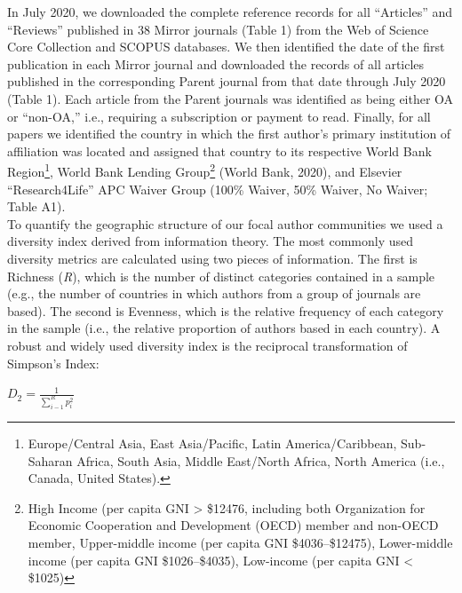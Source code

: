 \documentclass[
  english,
  man]{apa6}
\begin{document}
In July 2020, we downloaded the complete reference records for all ``Articles'' and ``Reviews'' published in 38 Mirror journals (Table 1) from the Web of Science Core Collection and SCOPUS databases. We then identified the date of the first publication in each Mirror journal and downloaded the records of all articles published in the corresponding Parent journal from that date through July 2020 (Table 1). Each article from the Parent journals was identified as being either OA or ``non-OA,'' i.e., requiring a subscription or payment to read. Finally, for all papers we identified the country in which the first author's primary institution of affiliation was located and assigned that country to its respective World Bank Region\footnote{Europe/Central Asia, East Asia/Pacific, Latin America/Caribbean, Sub-Saharan Africa, South Asia, Middle East/North Africa, North America (i.e., Canada, United States).}, World Bank Lending Group\footnote{High Income (per capita GNI \textgreater{} \$12476, including both Organization for Economic Cooperation and Development (OECD) member and non-OECD member, Upper-middle income (per capita GNI \$4036--\$12475), Lower-middle income (per capita GNI \$1026--\$4035), Low-income (per capita GNI \textless{} \$1025)} (World Bank, 2020), and Elsevier ``Research4Life'' APC Waiver Group (100\% Waiver, 50\% Waiver, No Waiver; Table A1).\\
To quantify the geographic structure of our focal author communities we used a diversity index derived from information theory. The most commonly used diversity metrics are calculated using two pieces of information. The first is Richness (\emph{R}), which is the number of distinct categories contained in a sample (e.g., the number of countries in which authors from a group of journals are based). The second is Evenness, which is the relative frequency of each category in the sample (i.e., the relative proportion of authors based in each country). A robust and widely used diversity index is the reciprocal transformation of Simpson's Index:

\(D_{2}=\frac{1}{\sum_{i-1}^{R} p_{i}^{2}}\)
\end{document}
